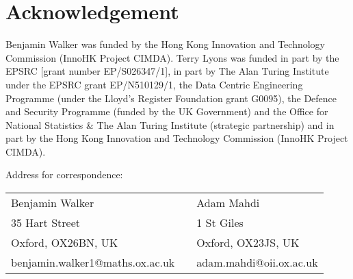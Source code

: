 \documentclass[twocolumn]{cinc}
\begin{document}
\section*{Acknowledgement}
Benjamin Walker was funded by the Hong Kong Innovation and Technology Commission (InnoHK Project CIMDA). Terry Lyons was funded in part by the EPSRC [grant number EP/S026347/1], in part by The Alan Turing Institute under the EPSRC grant EP/N510129/1, the Data Centric Engineering Programme (under the Lloyd’s Register Foundation grant G0095), the Defence and Security Programme (funded by the UK Government) and the Office for National Statistics \& The Alan Turing Institute (strategic partnership) and in part by the Hong Kong Innovation and Technology Commission (InnoHK Project CIMDA).





\medskip
{Address for correspondence:}
\smallskip

\begin{minipage}{\textwidth}
{\small
\begin{tabular}{lll}
Benjamin Walker                     &\qquad &  Adam Mahdi\\
35 Hart Street                      &&  1 St Giles\\ 
Oxford, OX26BN, UK                  && Oxford, OX23JS, UK \\
 benjamin.walker1@maths.ox.ac.uk    && adam.mahdi@oii.ox.ac.uk 
\end{tabular}
}
\end{minipage}
\end{document}
